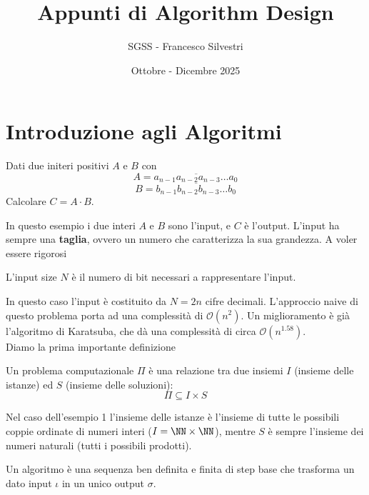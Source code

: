 \documentclass[11pt]{scrartcl}
\newcommand{\bigo}{\mathcal{O}}
\begin{document}
	\title{Appunti di Algorithm Design}
	\subtitle{SGSS - Francesco Silvestri}
	\date{Ottobre - Dicembre 2025}
	
	
	\maketitle
	
	\tableofcontents
	
	\newpage
	
	\section{Introduzione agli Algoritmi}
	
	\begin{example}\label{Integer Mult}
		Dati due initeri positivi $A$ e $B$ con 
		$$A=\overline{a_{n-1}a_{n-2}a_{n-3}\dots a_0}$$
		$$B=\overline{b_{n-1}b_{n-2}b_{n-3}\dots b_0}$$
		Calcolare $C=A\cdot B$.
	\end{example}
	In questo esempio i due interi $A$ e $B$ sono l'input, e $C$ è l'output. L'input ha sempre una \textbf{taglia}, ovvero un numero che caratterizza la sua grandezza. A voler essere rigorosi
	\begin{definition}
		L'input size $N$ è il numero di bit necessari a rappresentare l'input.
	\end{definition}
	In questo caso l'input è costituito da $N=2n$ cifre decimali. L'approccio naive di questo problema porta ad una complessità di $\bigo(n^2)$. Un miglioramento è già l'algoritmo di Karatsuba, che dà una complessità di circa $\bigo(n^{1.58})$. \\
	Diamo la prima importante definizione
	\begin{definition}
		Un problema computazionale $\Pi$ è una relazione tra due insiemi $I$ (insieme delle istanze) ed $S$ (insieme delle soluzioni):
		$$\Pi\subseteq I\times S$$
	\end{definition}
	Nel caso dell'esempio 1 l'insieme delle istanze è l'insieme di tutte le possibili coppie ordinate di numeri interi ($I=\NN\times\NN$), mentre $S$ è sempre l'insieme dei numeri naturali (tutti i possibili prodotti).
	
	\begin{definition}[Algoritmo]
		Un algoritmo è una sequenza ben definita e finita di step base che trasforma un dato input $\iota$ in un unico output $\sigma$.
	\end{definition} 
	
\end{document}
